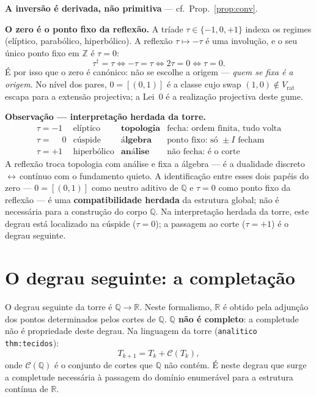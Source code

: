 \documentclass[11pt,a4paper]{article}
\newcommand{\code}[1]{\texttt{\small #1}}
\newcommand{\dg}{^{\dagger}}
\begin{document}
\medskip\noindent\textbf{A inversão é derivada, não primitiva} --- cf.\
Prop.~\ref{prop:conv}.

\medskip\noindent\textbf{O zero é o ponto fixo da reflexão.} A tríade
$\tau\in\{-1,0,+1\}$ indexa os regimes (elíptico, parabólico, hiperbólico). A
reflexão $\tau\mapsto-\tau$ é uma involução, e o seu único ponto fixo em
$\mathbb{Z}$ é $\tau=0$:
\[
\boxed{\;\tau\dg=\tau\iff -\tau=\tau\iff 2\tau=0\iff\tau=0.\;}
\]
É por isso que o zero é canónico: não se escolhe a origem --- \emph{quem se
fixa é a origem}. No nível dos pares, $0=[(0,1)]$ é a classe cujo swap
$(1,0)\notin V_{\mathrm{rat}}$ escapa para a extensão projectiva; a
Lei~$0$ é a realização projectiva deste gume.

\medskip\noindent\textbf{Observação --- interpretação herdada da torre.}
\[
\begin{array}{clll}
\tau=-1 & \text{elíptico} & \textbf{topologia} & \text{fecha: ordem finita, tudo volta}\\[2pt]
\tau=\phantom{-}0 & \text{cúspide} & \textbf{álgebra} & \text{ponto fixo: só }\pm I\text{ fecham}\\[2pt]
\tau=+1 & \text{hiperbólico} & \textbf{análise} & \text{não fecha: é o corte}
\end{array}
\]
A reflexão troca topologia com análise e fixa a álgebra --- é a dualidade
discreto\,$\leftrightarrow$\,contínuo com o fundamento quieto. A
identificação entre esses dois papéis do zero --- $0=[(0,1)]$ como neutro
aditivo de $\mathbb{Q}$ e $\tau=0$ como ponto fixo da reflexão --- é uma
\textbf{compatibilidade herdada} da estrutura global; não é necessária para a
construção do corpo $\mathbb{Q}$. Na interpretação herdada da torre, este
degrau está localizado na cúspide ($\tau=0$); a passagem ao corte ($\tau=+1$)
é o degrau seguinte.

\section{O degrau seguinte: a completação}\label{sec:qstar}

O degrau seguinte da torre é
$\mathbb{Q}\longrightarrow\mathbb{R}$.
Neste formalismo, $\mathbb{R}$ é obtido pela adjunção dos pontos determinados
pelos cortes de $\mathbb{Q}$. \textbf{$\mathbb{Q}$ não é completo}: a
completude não é propriedade deste degrau. Na linguagem da torre
(\code{analitico thm:tecidos}):
\[
T_{k+1}=T_{k}+\mathcal{C}(T_{k}),
\]
onde $\mathcal{C}(\mathbb{Q})$ é o conjunto de cortes que $\mathbb{Q}$ não
contém. É neste degrau que surge a completude necessária à passagem do domínio
enumerável para a estrutura contínua de $\mathbb{R}$.
\end{document}
